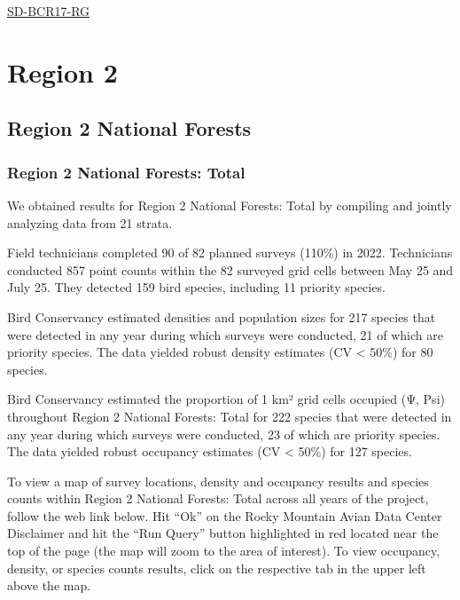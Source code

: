 \documentclass[
  letterpaper,
  DIV=11,
  numbers=noendperiod,
  oneside]{scrreprt}
\begin{document}
\href{http://www.rmbo.org/new_site/adc/QueryWindow.aspx\#N4IgzgLgTghhCuBbEAuABCAygEQLQCEBhAJQEYB2XYgcXWtgDsATNYgSwDcBTKNAOThsA9gxgAbNPRhgwYmMxABfIA==}{SD-BCR17-RG}

\hypertarget{region-2}{%
\section{Region 2}\label{region-2}}

\hypertarget{region-2-national-forests}{%
\subsection{Region 2 National Forests}\label{region-2-national-forests}}

\hypertarget{region-2-national-forests-total}{%
\subsubsection{Region 2 National Forests:
Total}\label{region-2-national-forests-total}}

We obtained results for Region 2 National Forests: Total by compiling
and jointly analyzing data from 21 strata.

Field technicians completed 90 of 82 planned surveys (110\%) in 2022.
Technicians conducted 857 point counts within the 82 surveyed grid cells
between May 25 and July 25. They detected 159 bird species, including 11
priority species.

Bird Conservancy estimated densities and population sizes for 217
species that were detected in any year during which surveys were
conducted, 21 of which are priority species. The data yielded robust
density estimates (CV \textless{} 50\%) for 80 species.

Bird Conservancy estimated the proportion of 1 km² grid cells occupied
(Ψ, Psi) throughout Region 2 National Forests: Total for 222 species
that were detected in any year during which surveys were conducted, 23
of which are priority species. The data yielded robust occupancy
estimates (CV \textless{} 50\%) for 127 species.

To view a map of survey locations, density and occupancy results and
species counts within Region 2 National Forests: Total across all years
of the project, follow the web link below. Hit ``Ok'' on the Rocky
Mountain Avian Data Center Disclaimer and hit the ``Run Query'' button
highlighted in red located near the top of the page (the map will zoom
to the area of interest). To view occupancy, density, or species counts
results, click on the respective tab in the upper left above the map.
\end{document}
